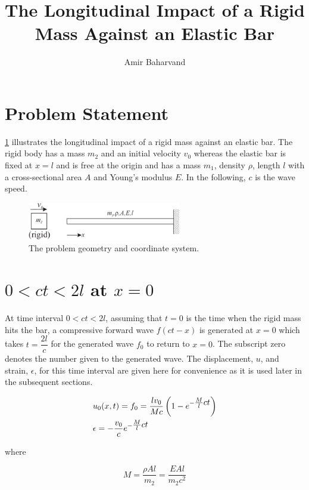 \documentclass{article}
\title{The Longitudinal Impact of a Rigid Mass Against an Elastic Bar}
\author{Amir Baharvand }
\date{}
\begin{document}
\maketitle

\section{Problem Statement}
\cref{fig:problem} illustrates the longitudinal impact of a rigid mass against an elastic bar. The rigid body has a mass $m_2$ and an initial velocity $v_0$ whereas the elastic bar is fixed at $x=l$ and is free at the origin and has a mass $m_1$, density $\rho$, length $l$ with a cross-sectional area $A$ and Young's modulus $E$. In the following, $c$ is the wave speed.

\begin{figure}[H]
    \centering
    \includegraphics[width = 0.6\textwidth ]{figures/problem_statement.pdf}
    \caption{The problem geometry and coordinate system.}
    \label{fig:problem}
\end{figure}

\section{$0 < ct < 2l$ at $x=0$}
At time interval $0 < ct < 2l$, assuming that $t=0$ is the time when the rigid mass hits the bar, a compressive forward wave $f(ct-x)$ is generated at $x=0$ which takes $t=\dfrac{2l}{c}$ for the generated wave $f_0$ to return to $x=0$. The subscript zero denotes the number given to the generated wave. The displacement, $u$, and strain, $\epsilon$, for this time interval are given here for convenience as it is used later in the subsequent sections.

\begin{align}
    & u_0(x, t) = f_0 = \frac{l v_0}{M c} \left( 1 - e^{-\textstyle\frac{M}{l}ct} \right ) \notag\\ 
    & \epsilon = -\frac{v_0}{c} e^{-\textstyle\frac{M}{l}ct}
    \label{eq:displ_str_t0}
\end{align}

where 

\begin{equation}
    M = \frac{\rho A l}{m_2} = \frac{E A l}{m_2 c^2}
    \label{eq:M}
\end{equation}
\end{document}
